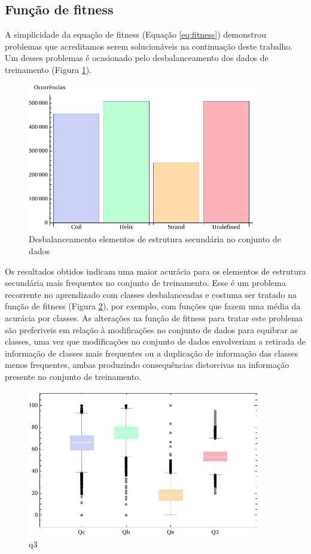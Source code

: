 \subsection{Função de fitness}

A simplicidade da equação de fitness (Equação \ref{eq:fitness}) demonstrou problemas que acreditamos serem solucionáveis na continuação deste trabalho. Um desses problemas é ocasionado pelo desbalanceamento dos dados de treinamento (Figura \ref{fig:occ_ss}). 

\begin{figure}
  \centering
  \includegraphics[width=0.9\textwidth]{figures/occ_ss.pdf}
  \caption{Desbalanceamento elementos de estrutura secundária no conjunto de dados}
        \label{fig:occ_ss}
\end{figure}

Os resultados obtidos indicam uma maior acurácia para os elementos de estrutura secundária mais frequentes no conjunto de treinamento. Esse é um problema recorrente no aprendizado com classes desbalanceadas e costuma ser tratado na função de fitness (Figura \ref{fig:q3}), por exemplo, com funções que fazem uma média da acurácia por classes. As alterações na função de fitness para tratar este problema são preferiveis em relação à modificações no conjunto de dados para equibrar as classes, uma vez que modificações no conjunto de dados envolveriam a retirada de informação de classes mais frequentes ou a duplicação de informação das classes menos frequentes, ambas produzindo consequências distorcivas na informação presente no conjunto de treinamento.

\begin{figure}
  \centering
  \includegraphics[width=0.9\textwidth]{figures/q3.pdf}
  \caption{q3}
        \label{fig:q3}
\end{figure}

